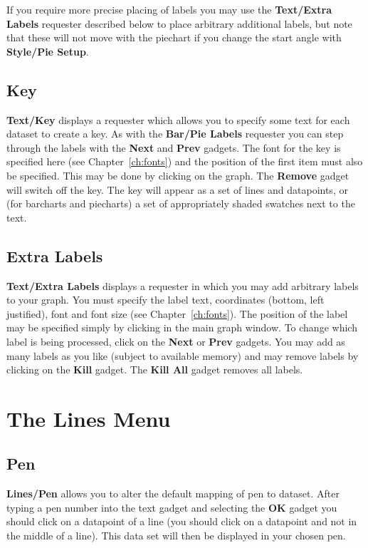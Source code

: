 \documentclass{report}
\begin{document}
If you require more precise placing of labels you may use the {\bf Text/Extra Labels}
requester described below to place arbitrary additional labels, but note that these 
will not move with the piechart if you change the start angle with {\bf Style/Pie 
Setup}.


\subsection{Key}
{\bf Text/Key} displays a requester which allows you to specify 
some text for 
each dataset to create a key. As with the {\bf Bar/Pie Labels} requester you can 
step through the labels with the {\bf Next} and {\bf Prev} gadgets. The font for 
the key is specified here (see Chapter~\ref{ch:fonts}) and the position of the 
first item must also be specified.
This may be done by clicking on the graph. The {\bf Remove} gadget will switch off 
the key. The key will appear as a set of lines and datapoints, or (for barcharts 
and piecharts) a set of appropriately shaded swatches next to the text.


\subsection{Extra Labels}
\label{ss:linlab}
{\bf Text/Extra Labels}  displays a requester in which you may 
add arbitrary labels to your graph.
You must specify the label text, coordinates (bottom, left justified), 
font and font size (see Chapter~\ref{ch:fonts}).
The position of the label may be specified simply by clicking in the main graph 
window.
To change which label is being processed, click on the {\bf Next} or {\bf Prev}
gadgets. You may add as many labels as you like (subject to available memory) and 
may remove labels by clicking on the {\bf Kill} gadget. The {\bf Kill All} gadget 
removes all labels.



\section{The Lines Menu}


\subsection{Pen}
\label{ss:pen}
{\bf Lines/Pen}  allows you to alter the default mapping of pen to 
dataset. After typing a
pen number into the text gadget and selecting the {\bf OK} gadget you should click
on a datapoint of a line (you should click on a datapoint 
and not in the middle of a line). This data set will then be displayed in your chosen 
pen.
\end{document}
